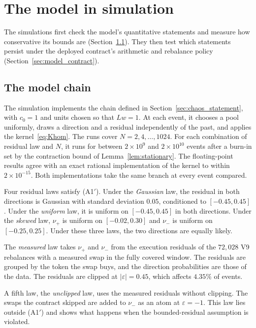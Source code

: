 \documentclass[11pt,a4paper]{article}
\theoremstyle{siphon}
\begin{document}
\section{The model in simulation}\label{sec:model_tests}

The simulations first check the model's quantitative statements and measure how conservative its bounds are (Section~\ref{sec:chaos_numerical}). They then test which statements persist under the deployed contract's arithmetic and rebalance policy (Section~\ref{sec:model_contract}).

\subsection{The model chain}\label{sec:chaos_numerical}

The simulation implements the chain defined in Section~\ref{sec:chaos_statement}, with $c_0 = 1$ and units chosen so that $Lw = 1$. At each event, it chooses a pool uniformly, draws a direction and a residual independently of the past, and applies the kernel~\eqref{eq:Khom}. The runs cover $N = 2, 4, \ldots, 1024$. For each combination of residual law and $N$, it runs for between $2 \times 10^9$ and $2 \times 10^{10}$ events after a burn-in set by the contraction bound of Lemma~\ref{lem:stationary}. The floating-point results agree with an exact rational implementation of the kernel to within $2 \times 10^{-15}$. Both implementations take the same branch at every event compared.

Four residual laws satisfy (A1$'$). Under the \emph{Gaussian} law, the residual in both directions is Gaussian with standard deviation $0.05$, conditioned to $[-0.45, 0.45]$. Under the \emph{uniform} law, it is uniform on $[-0.45, 0.45]$ in both directions. Under the \emph{skewed} law, $\nu_+$ is uniform on $[-0.02, 0.30]$ and $\nu_-$ is uniform on $[-0.25, 0.25]$. Under these three laws, the two directions are equally likely.

The \emph{measured} law takes $\nu_+$ and $\nu_-$ from the execution residuals of the $72{,}028$ V9 rebalances with a measured swap in the fully covered window. The residuals are grouped by the token the swap buys, and the direction probabilities are those of the data. The residuals are clipped at $|\varepsilon| = 0.45$, which affects $4.35\%$ of events.

A fifth law, the \emph{unclipped} law, uses the measured residuals without clipping. The swaps the contract skipped are added to $\nu_-$ as an atom at $\varepsilon = -1$. This law lies outside (A1$'$) and shows what happens when the bounded-residual assumption is violated.
\end{document}
